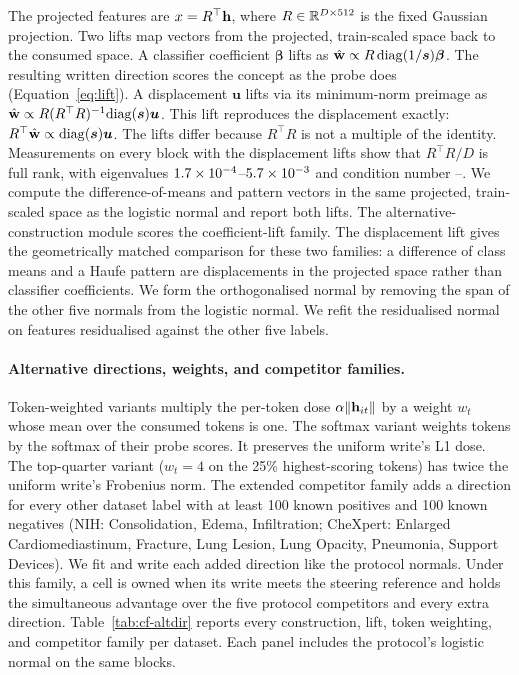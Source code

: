 \documentclass{article}
\begin{document}
The projected features are $x=R^{\top}\mathbf{h}$, where $R\in\mathbb{R}^{D\times512}$ is the fixed Gaussian projection. Two lifts map vectors from the projected, train-scaled space back to the consumed space. A classifier coefficient $\boldsymbol\beta$ lifts as $\hat{\mathbf{w}}\propto R\,\mathrm{diag}(1/\boldsymbol s)\boldsymbol\beta$. The resulting written direction scores the concept as the probe does (Equation~\ref{eq:lift}). A displacement $\boldsymbol u$ lifts via its minimum-norm preimage as $\hat{\mathbf{w}}\propto R(R^{\top}R)^{-1}\mathrm{diag}(\boldsymbol s)\boldsymbol u$. This lift reproduces the displacement exactly: $R^{\top}\hat{\mathbf{w}}\propto\mathrm{diag}(\boldsymbol s)\boldsymbol u$. The lifts differ because $R^{\top}R$ is not a multiple of the identity. Measurements on every block with the displacement lifts show that $R^{\top}R/D$ is full rank, with eigenvalues $1.7\times10^{-4}$--$5.7\times10^{-3}$ and condition number \cfAltdirdCondMin{}--\cfAltdirdCondMax{}. We compute the difference-of-means and pattern vectors in the same projected, train-scaled space as the logistic normal and report both lifts. The alternative-construction module scores the coefficient-lift family. The displacement lift gives the geometrically matched comparison for these two families: a difference of class means and a Haufe pattern are displacements in the projected space rather than classifier coefficients. We form the orthogonalised normal by removing the span of the other five normals from the logistic normal. We refit the residualised normal on features residualised against the other five labels.

\paragraph{Alternative directions, weights, and competitor families.} Token-weighted variants multiply the per-token dose $\alpha\lVert\mathbf{h}_{it}\rVert$ by a weight $w_t$ whose mean over the consumed tokens is one. The softmax variant weights tokens by the softmax of their probe scores. It preserves the uniform write's L1 dose. The top-quarter variant ($w_t=4$ on the 25\% highest-scoring tokens) has twice the uniform write's Frobenius norm. The extended competitor family adds a direction for every other dataset label with at least 100 known positives and 100 known negatives (NIH: Consolidation, Edema, Infiltration; CheXpert: Enlarged Cardiomediastinum, Fracture, Lung Lesion, Lung Opacity, Pneumonia, Support Devices). We fit and write each added direction like the protocol normals. Under this family, a cell is owned when its write meets the steering reference and holds the simultaneous advantage over the five protocol competitors and every extra direction. Table~\ref{tab:cf-altdir} reports every construction, lift, token weighting, and competitor family per dataset. Each panel includes the protocol's logistic normal on the same blocks.
\end{document}
